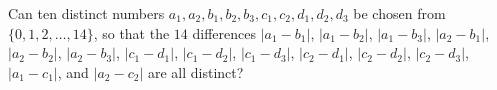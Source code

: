 Can ten distinct numbers $a_1, a_2, b_1, b_2, b_3, c_1, c_2, d_1, d_2, d_3$ be chosen from $\{0, 1, 2, \ldots, 14\}$,  so that the $14$ differences $|a_1 - b_1|$,  $|a_1 - b_2|$,  $|a_1 - b_3|$,  $|a_2 - b_1|$,  $|a_2 - b_2|$,  $|a_2 - b_3|$,  $|c_1 - d_1|$,  $|c_1 - d_2|$,  $|c_1 - d_3|$,  $|c_2 - d_1|$,  $|c_2 - d_2|$,  $|c_2 - d_3|$,  $|a_1 - c_1|$,  and $|a_2 - c_2|$ are all distinct?